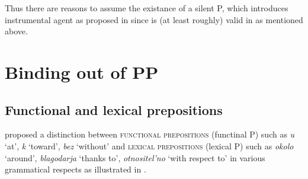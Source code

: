 \documentclass[output=paper,colorlinks,citecolor=brown,newtxmath]{langsci/langscibook}
\begin{document}
\noindent
Thus there are reasons to assume the existance of a silent P, which introduces instrumental agent as proposed in  since  is (at least roughly) valid in  as mentioned above.


\section{Binding out of PP}\label{sec:PP}

\subsection{Functional and lexical prepositions}

\citet{YadroffFranks2001} proposed a distinction between \textsc{functional prepositions} (functinal P) such as \textit{u} `at', \textit{k} `toward',  \textit{bez} `without' and \textsc{lexical prepositions} (lexical P) such as \textit{okolo} `around', \textit{blagodarja} `thanks to', \textit{otnositel'no} `with respect to' in various grammatical respects as illustrated in  .
\end{document}
